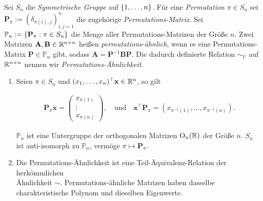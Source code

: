                 \begin{definition}
                    
                    Sei $S_n$ die \textit{Symmetrische Gruppe} auf ${\left \{ 1, \dots, n \right \}}$.
                    Für eine \textit{Permutation} $\pi \in S_n$ sei $\mathbf P_\pi := (\delta_{\pi(i), j})_{i, j = 1}^n$ die zugehörige \textit{Permutations-Matrix}.
                    Sei $\mathbb P_n := {\left \{ \mathbf P_\pi: \pi \in S_n \right \}}$ die Menge aller Permutations-Matrizen der Größe $n$.
                    Zwei Matrizen $\mathbf A, \mathbf B \in \mathbb R^{n \times n}$ heißen \textit{permutations-ähnlich}, wenn es eine Permutations-Matrix $\mathbf P \in \mathbb P_n$ gibt, sodass $\mathbf A = \mathbf P^{-1} \mathbf B \mathbf P$.
                    Die dadurch definierte Relation $\sim_{\mathbb P}$ auf $\mathbb R^{n \times n}$ nennen wir \textit{Permutations-Ähnlichkeit}.

                \end{definition}

                \begin{lemma} \label{lem:permutation_matrices}

                    \begin{enumerate}[
                        label = \arabic*.,
                        wide,
                        labelindent = 0pt
                    ]

                        \item Seien $\pi \in S_n$ und $(x_1, \dots, x_n)^\top \mathbf x \in \mathbb R^n$, so gilt

                        \begin{align*}
                            \mathbf P_\pi \mathbf x
                            =
                            \begin{pmatrix}
                                x_{\pi(1)} \\ \vdots \\ x_{\pi(n)}
                            \end{pmatrix},
                            \quad
                            \text{und}
                            \quad
                            \mathbf x^\top \mathbf P_\pi
                            =
                            (x_{\pi^{-1}(1)}, \dots, x_{\pi^{-1}(n)}).
                        \end{align*}

                        $\mathbb P_n$ ist eine Untergruppe der orthogonalen Matrizen $\operatorname O_n(\mathbb R)$ der Größe $n$.
                        $S_n$ ist anti-isomorph zu $\mathbb P_n$, vermöge $\pi \mapsto \mathbf P_\pi$.

                        \item Die Permutations-Ähnlichkeit ist eine Teil-Äquivalenz-Relation der herkömmlichen \\ Ähnlichkeit $\sim$.
                        Permutations-ähnliche Matrizen haben dasselbe charakteristische Polynom und dieselben Eigenwerte.
                    
                    \end{enumerate}

                \end{lemma}

